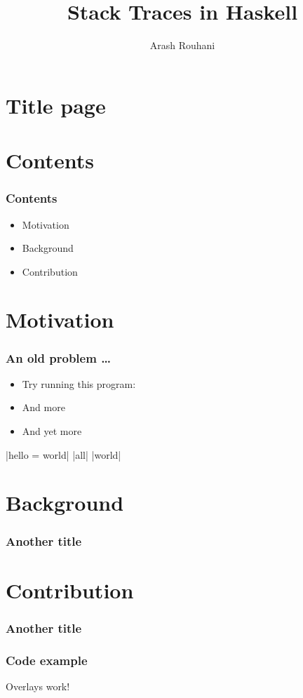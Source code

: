 \documentclass[11pt]{beamer} %
\title{Stack Traces in Haskell}
\author[Arash Rouhani]{Arash Rouhani} %
\institute{Chalmers University of Technology}
\begin{document}



\section{Title page} %
\begin{frame}[plain]
 \titlepage
\end{frame}

\section{Contents}
\begin{frame}
 \frametitle{Contents}
\begin{itemize}
 \item Motivation
 \item Background
 \item Contribution
\end{itemize}
\end{frame}

\section{Motivation}
\begin{frame}
 \frametitle{An old problem \dots}
\begin{itemize}
 \item Try running this program:
   \motivationCode
 \item And more
 \item And yet more
\end{itemize}
  |hello = world|
  |all|
  |world|
\end{frame}

\section{Background}
\begin{frame}
 \frametitle{Another title}
\end{frame}

\section{Contribution}
\begin{frame}
 \frametitle{Another title}
\end{frame}

\begin{frame}
\frametitle{Code example}
\exampleCode
\pause
Overlays work!
\end{frame}
\end{document}
